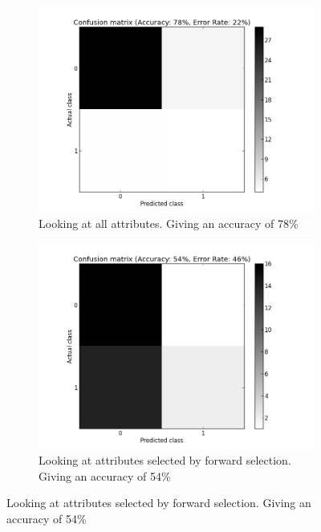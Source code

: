 \begin{figure}[H]
	\begin{subfigure}[b]{0.5\textwidth}
	\includegraphics[scale=0.2]{pictures/cmX.png}
	\caption{Looking at all attributes. \newline Giving an accuracy of 78\% }
	\label{cmResultX}
	\end{subfigure}
	\begin{subfigure}[b]{0.5\textwidth}
	\includegraphics[scale=0.2]{pictures/cmXAD.png}	
	\caption{Looking at attributes selected by forward selection.  Giving an accuracy of 54\%}
	\label{cmResultXad}
	\end{subfigure}


\end{figure}
